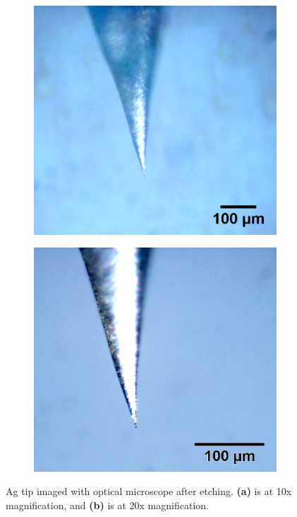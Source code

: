 \begin{figure} [h]
    \centering
    \begin{subfigure}[t]{0.35\textwidth}
    \includegraphics[width=\textwidth]{pictures/10x_meniscus_agtip_sb.png}
    \caption{}
    \end{subfigure}
    \hspace{0.5cm}
    \begin{subfigure}[t]{0.36\textwidth}
    \includegraphics[width=\textwidth]{pictures/20x_meniscus_agtip_sb.png}
    \caption{}
    \end{subfigure}
    
    \caption{Ag tip imaged with optical microscope after etching. \textbf{(a)} is at 10x magnification, and \textbf{(b)} is at 20x magnification.}
    \label{fig:expsetup:image-plasmon}
\end{figure}

